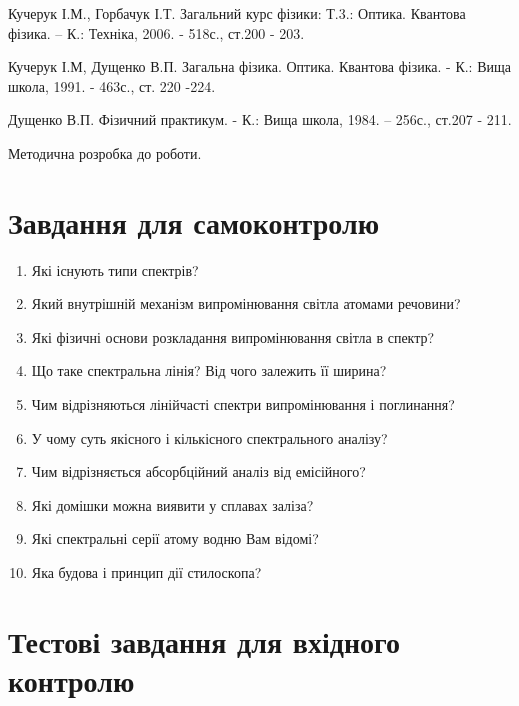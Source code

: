 \documentclass[twocolumn]{el-author}
\begin{document}
\begin{thebibliography}{}

Кучерук І.М., Горбачук І.Т. Загальний курс фізики: Т.3.: Оптика.
Квантова фізика. -- К.: Техніка, 2006. - 518с., ст.200 - 203.

Кучерук І.М, Дущенко В.П. Загальна фізика. Оптика. Квантова
фізика. - К.: Вища школа, 1991. - 463с., ст. 220 -224.

Дущенко В.П. Фізичний практикум. - К.: Вища школа, 1984. --
256с., ст.207 - 211.

Методична розробка до роботи.

\end{thebibliography}

\section{Завдання для самоконтролю}

\begin{enumerate}
	\item Які існують типи спектрів?
	\item Який внутрішній механізм випромінювання світла атомами
речовини?
	\item Які фізичні основи розкладання випромінювання світла в спектр?
	\item Що таке спектральна лінія? Від чого залежить її ширина?
	\item Чим відрізняються лінійчасті спектри випромінювання
і поглинання?
	\item У чому суть якісного і кількісного спектрального аналізу?
	\item Чим відрізняється абсорбційний аналіз від емісійного?
	\item Які домішки можна виявити у сплавах заліза?
	\item Які спектральні серії атому водню Вам відомі?
	\item Яка будова і принцип дії стилоскопа?
\end{enumerate}

\clearpage
\section{Тестові завдання для вхідного контролю}
\end{document}
